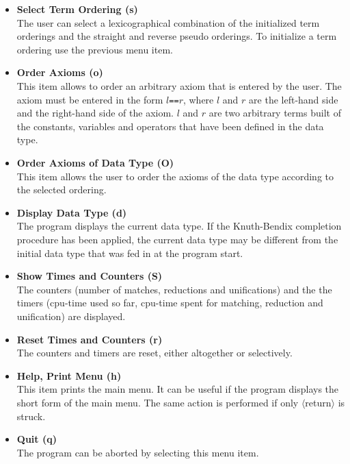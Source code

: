 \begin{itemize}
\item{\bf Select Term Ordering (s)}\\
The user can select a lexicographical combination of the initialized
term orderings and the straight and reverse pseudo orderings.
To initialize a term ordering use the previous menu item.

\item{\bf Order Axioms (o)}\\
This item allows to order an arbitrary axiom that is entered by the user.
The axiom must be entered in the form $l${\tt ==}$r$, where $l$ and $r$
are the left-hand side and the right-hand side of the axiom. $l$ and $r$
are two arbitrary terms built of the constants, variables and operators
that have been defined in the data type.

\item{\bf Order Axioms of Data Type (O)}\\
This item allows the user to order the axioms of the data type according
to the selected ordering.

\item {\bf Display Data Type (d)}\\
The program displays the current data type. If the Knuth-Bendix
completion procedure has been applied, the current data type may be
different from the initial data type that was fed in at the program
start.

\item {\bf Show Times and Counters (S)}\\
The counters (number of matches, reductions and unifications) and the 
the timers (cpu-time used so far, cpu-time spent for matching,
reduction and unification) are displayed.

\item {\bf Reset Times and Counters (r)}\\
The counters and timers are reset, either altogether or selectively.

\item {\bf Help, Print Menu (h)}\\
This item prints the main menu. It can be useful if the program
displays the short form  of the main menu. The same action is performed
if only $\langle$return$\rangle$ is struck.

\item {\bf Quit (q)}\\
The program can be aborted by selecting this menu item.
\end{itemize}

